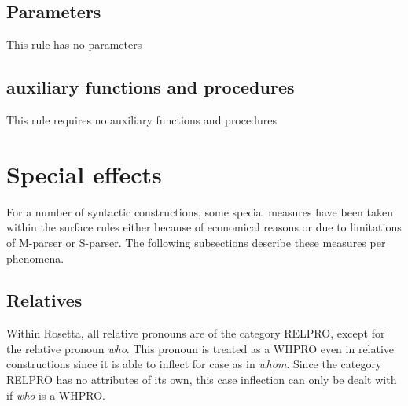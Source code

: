 \subsection{Parameters}
This rule has no parameters
\subsection{auxiliary functions and procedures}
This rule requires no auxiliary functions and procedures
\section{Special effects}
For a number of syntactic constructions, some special measures have been taken 
within the surface rules either because of economical reasons or due to 
limitations of M-parser or S-parser. The following 
subsections describe these measures per phenomena.
\subsection{Relatives}
Within Rosetta, all relative pronouns are of the category RELPRO, except for 
the relative pronoun {\em who}. This pronoun is treated as a WHPRO even in 
relative constructions since it is able to inflect for case as in {\em whom}. 
Since the category RELPRO has no attributes of its own, this case inflection 
can only be dealt with if {\em who} is a WHPRO. \\

